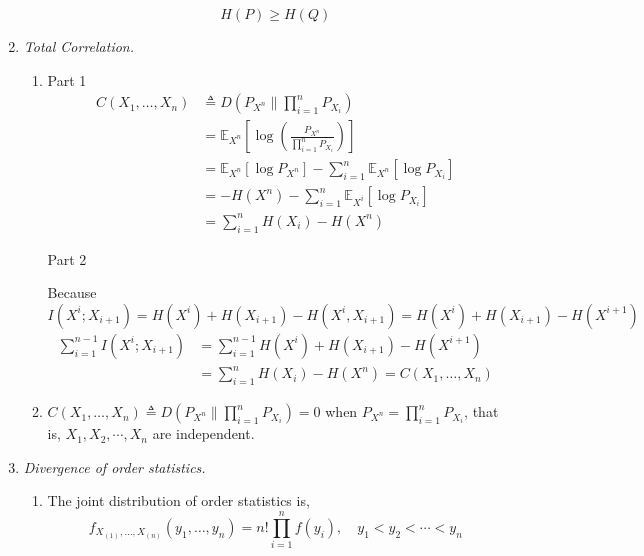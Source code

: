 \documentclass[a4paper]{article}
\begin{document}
\begin{enumerate}
\begin{enumerate}
      \begin{equation}
        H(P) \geqslant H(Q)
      \end{equation}

     \end{enumerate}

     \item \textit{Total Correlation.}
     \begin{enumerate}
       \item Part 1
       \begin{equation}
        \begin{aligned}
          C\left(X_{1}, \ldots, X_{n}\right) & \triangleq D\left(P_{X^{n}} \| \prod_{i=1}^{n} P_{X_{i}}\right) \\
          & = \mathbb{E}_{X^n} [\log \left(\frac{P_{X^n}}{\prod_{i=1}^n P_{X_i}}\right)] \\
          & = \mathbb{E}_{X^n} [\log P_{X^n}] - \sum_{i=1}^n \mathbb{E}_{X^n} [\log P_{X_i}] \\
          & = -H(X^n) - \sum_{i=1}^n \mathbb{E}_{X^i} [\log P_{X_i}] \\
          & = \sum_{i=1}^n H(X_i) -H(X^n)
        \end{aligned}
       \end{equation}

       Part 2

       Because $I(X^i;X_{i+1}) =H(X^i) + H(X_{i+1}) - H(X^i,X_{i+1}) = H(X^i) + H(X_{i+1}) - H(X^{i+1})$
       \begin{equation}
         \begin{aligned}
           \sum_{i=1}^{n-1} I(X^i;X_{i+1}) & = \sum_{i=1}^{n-1}H(X^i) + H(X_{i+1}) - H(X^{i+1}) \\ & = \sum_{i=1}^{n}H(X_i)  - H(X^{n}) =  C\left(X_{1}, \ldots, X_{n}\right)
         \end{aligned}
       \end{equation}

    \item $C\left(X_{1}, \ldots, X_{n}\right) \triangleq D\left(P_{X^{n}} \| \prod_{i=1}^{n} P_{X_{i}}\right) = 0$ when $P_{X^{n}} = \prod_{i=1}^{n} P_{X_{i}}$, that is, $X_1,X_2,\cdots,X_n$ are independent.
    
     \end{enumerate}

     \item \textit{Divergence of order statistics.}
     \begin{enumerate}
       \item The joint distribution of order statistics is, 
       \begin{equation}
        f_{X_{(1)}, \ldots, X_{(n)}}\left(y_{1}, \ldots, y_{n}\right)=n ! \prod_{i=1}^{n} f\left(y_{i}\right), \quad y_{1}<y_{2}<\cdots<y_{n}
       \end{equation}



\end{enumerate}
\end{enumerate}
\end{document}
